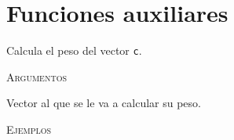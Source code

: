 \section{Funciones auxiliares}

\begin{description}[leftmargin=1em, font=\normalfont\ttfamily, style=nextline]
    \item[get\_weight(c)]
  
    Calcula el peso del vector \texttt{c}.
  
    \textsc{Argumentos}
    \begin{description}[font=\normalfont\ttfamily]
        \item[c] Vector al que se le va a calcular su peso.
    \end{description}

    \textsc{Ejemplos}
    \begin{lstlisting}[gobble=4]
        % TODO
    \end{lstlisting}
\end{description}